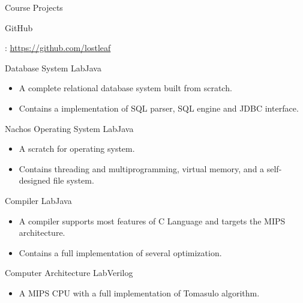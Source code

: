 \documentclass{resume} %
\begin{document}
\begin{rSection}{Course Projects}{\begin{bf}GitHub\end{bf}: \href{https://github.com/lostleaf?tab=repositories}{https://github.com/lostleaf}}

\begin{rSubsection}{Database System Lab}{Java}{}
\begin{itemize}
\item  A complete relational database system built from scratch. 
\item Contains a implementation of SQL parser, SQL engine and JDBC interface.
\end{itemize}
\end{rSubsection}
\vspace{3pt}
\begin{rSubsection}{Nachos Operating System Lab}{Java}{}
\begin{itemize}
\item A scratch for operating system.
\item Contains threading and multiprogramming, virtual memory, and a self-designed file system.
\end{itemize}
\end{rSubsection}
\vspace{3pt}
\begin{rSubsection}{Compiler Lab}{Java}{}
\begin{itemize}
\item A compiler supports most features of C Language and targets the MIPS architecture. 
\item Contains a full implementation of several optimization.
\end{itemize}
\end{rSubsection}
\vspace{3pt}
\begin{rSubsection}{Computer Architecture Lab}{Verilog}{}
\begin{itemize}
\item A MIPS CPU with a full implementation of Tomasulo algorithm.

\end{itemize}
\end{rSubsection}

\end{rSection}
\vspace{10pt}
\end{document}
